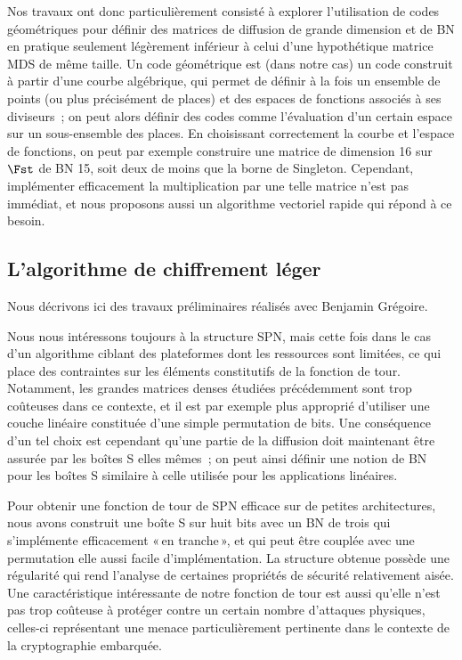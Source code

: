 Nos travaux ont donc particulièrement consisté à explorer l'utilisation de codes géométriques pour définir des matrices de diffusion
de grande dimension et de BN en pratique seulement légèrement inférieur à celui d'une hypothétique matrice MDS de même taille.
Un code géométrique est (dans notre cas) un code construit à partir d'une courbe algébrique, qui permet de définir à la fois un ensemble
de points (ou plus précisément de places) et des espaces de fonctions associés à ses diviseurs~; on peut alors définir des codes
comme l'évaluation d'un certain espace sur un sous-ensemble des places.
En choisissant correctement la courbe et l'espace de fonctions, on peut par exemple construire une matrice de dimension 16 sur
$\Fst$ de BN 15, soit deux de moins que la borne de Singleton. Cependant, implémenter efficacement la multiplication par une telle
matrice n'est pas immédiat, et nous proposons aussi un algorithme vectoriel rapide qui répond à ce besoin.

\subsection{L'algorithme de chiffrement léger \fly \cite{fly}}

Nous décrivons ici des travaux préliminaires réalisés avec Benjamin Grégoire.

\medskip

Nous nous intéressons toujours à la structure SPN, mais cette fois dans le cas d'un algorithme ciblant des plateformes dont les ressources
sont limitées, ce qui place des contraintes sur les éléments constitutifs de la fonction de tour. Notamment, les grandes matrices
denses étudiées précédemment sont trop coûteuses dans ce contexte, et il est par exemple plus approprié d'utiliser une couche linéaire
constituée d'une simple permutation de bits. Une conséquence d'un tel choix est cependant qu'une partie de la diffusion doit maintenant
être assurée par les boîtes S elles mêmes~; on peut ainsi définir une notion de BN pour les boîtes S similaire à celle utilisée pour
les applications linéaires.

Pour obtenir une fonction de tour de SPN efficace sur de petites architectures, nous avons construit une boîte S sur huit bits avec
un BN de trois qui s'implémente efficacement «\,en tranche\,», et qui peut être couplée avec une permutation elle aussi facile
d'implémentation. La structure obtenue possède une régularité qui rend l'analyse de certaines propriétés de sécurité
relativement aisée. Une caractéristique intéressante de notre fonction de tour est aussi qu'elle n'est pas trop coûteuse à protéger
contre un certain nombre d'attaques physiques, celles-ci représentant une menace particulièrement pertinente dans le contexte
de la cryptographie embarquée.

